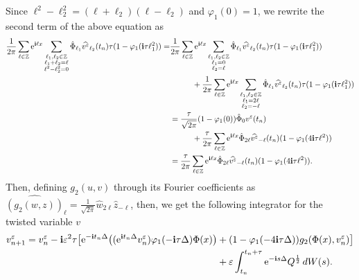 \documentclass[a4paper]{amsart}
\begin{document}
Since $\ell^2-\ell_2^2=(\ell+\ell_2)(\ell-\ell_2)$ and $\varphi_1(0)=1$, we rewrite the second term of the above equation as
\begin{align*}
\frac{1}{2\pi}\displaystyle\sum_{\ell\in\mathbb{Z}}{\rm e}^{{\bf i}\ell x}\displaystyle\sum_{\substack{\ell_1,\ell_2\in\mathbb{Z} \\ \ell_1+\ell_2=\ell\\ \ell^2-\ell_2^2=0}} \hat{\Phi}_{\ell_1}\widehat{v^\varepsilon}_{\ell_2}(t_n)\tau (1-\varphi_1({\bf i}\tau \ell_1^2))
=&\frac{1}{2\pi} \displaystyle\sum_{\ell\in\mathbb{Z}}{\rm e}^{{\bf i}\ell x}\displaystyle\sum_{\substack{\ell_1,\ell_2\in\mathbb{Z}\\ \ell_1=0\\ \ell_2=\ell}} \hat{\Phi}_{\ell_1}\widehat{v^\varepsilon}_{\ell_2}(t_n)\tau (1-\varphi_1({\bf i}\tau \ell_1^2))\\
&\hspace{1cm}+\frac{1}{2\pi}\displaystyle\sum_{\ell\in\mathbb{Z}}{\rm e}^{{\bf i}\ell x}\displaystyle\sum_{\substack{\ell_1,\ell_2\in\mathbb{Z} \\ \ell_1=2\ell\\ \ell_2=-\ell}} \hat{\Phi}_{\ell_1}\widehat{v^\varepsilon}_{\ell_2}(t_n)\tau (1-\varphi_1({\bf i}\tau \ell_1^2))\\
&=\frac{\tau}{\sqrt{2\pi}} (1-\varphi_1(0))\hat{\Phi}_0 v^\varepsilon(t_n)\\
&\hspace{1cm}+\frac{\tau}{2\pi} \displaystyle\sum_{\ell\in\mathbb{Z}}{\rm e}^{{\bf i}\ell x} \hat{\Phi}_{2 \ell}\widehat{v^\varepsilon}_{-\ell}(t_n)(1-\varphi_1(4{\bf i}\tau \ell^2))\\
&=\frac{\tau}{2\pi} \displaystyle\sum_{\ell\in\mathbb{Z}}{\rm e}^{{\bf i}\ell x} \hat{\Phi}_{2 \ell}\widehat{v^\varepsilon}_{-\ell}(t_n)(1-\varphi_1(4{\bf i}\tau \ell^2)).
\end{align*}
Then, defining $g_2(u,v)$ through its Fourier coefficients as $\widehat{(g_2(w,z))}_\ell = \frac{1}{\sqrt{2\pi}}\hat{w}_{2\ell} \hat{z}_{-\ell}$, then, we get the following integrator for the twisted variable $v$
\begin{align}
v^\varepsilon_{n+1}=v^\varepsilon_n-{\bf i}\varepsilon^2 \tau \big[{\rm e}^{-{\bf i}t_n\Delta }\big(({\rm e}^{{\bf i}t_n\Delta }v^\varepsilon_n )\varphi_1(-{\bf i}\tau \Delta)\Phi(x)\big)&+ (1-\varphi_1(-4{\bf i}\tau \Delta))g_2(\Phi(x),v^\varepsilon_n)\big]\notag \\
&+\varepsilon\int_{t_n}^{t_n+\tau}{\rm e}^{-{\bf i}s \Delta}Q^{\frac{1}{2}}\,dW(s)\label{twis_met_lin_small}.
\end{align}
\end{document}
